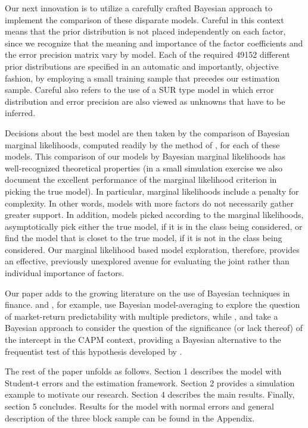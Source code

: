 Our next innovation is to utilize a carefully crafted Bayesian approach to implement the comparison of these disparate models. Careful in this context means that the prior distribution is not placed independently on each factor, since we recognize that the meaning and importance of the factor coefficients and the error precision matrix vary by model. 
Each of the required 49152 different prior distributions are specified in an automatic and importantly, objective fashion, by employing a small training sample that precedes our estimation sample. 
Careful also refers to the use of a SUR type model in which error distribution and error precision are also viewed as unknowns that have to be inferred.

Decisions about the best model are then taken by the comparison of Bayesian marginal likelihoods, computed readily by the method of \cite{chib1995marginal}, for each of these models. 
This comparison of our models by Bayesian marginal likelihoods has well-recognized theoretical properties (in a small simulation exercise we also document the excellent performance of the marginal likelihood criterion in picking the true model). 
In particular, marginal likelihoods include a penalty for complexity. 
In other words, models with more factors do not necessarily gather greater support. 
In addition, models picked according to the marginal likelihoods, asymptotically pick either the true model, if it is in the class being considered, or find the model that is closet to the true model, if it is not in the class being considered. 
Our marginal likelihood based model exploration, therefore, provides an effective, previously unexplored avenue for evaluating the joint rather than individual importance of factors.


Our paper adds to the growing literature on the use of Bayesian techniques in finance.
\cite{avramov2002stock} and \cite{cremers2002stock}, for example, use Bayesian model-averaging to explore the question of market-return predictability with multiple predictors, while \cite{shanken1987bayesian}, \cite{harvey1990bayesian} and \cite{avramov2006exact} take a Bayesian approach to consider the question of the significance (or lack thereof) of the intercept in the CAPM context, providing a Bayesian alternative to the frequentist test of this hypothesis developed by \cite{gibbons1989test}.



The rest of the paper unfolds as follows.
Section 1 describes the model with Student-t errors and the estimation framework. 
Section 2 provides a simulation example to motivate our research.
Section 4 describes the main results. 
Finally, section 5 concludes. 
Results for the model with normal errors and general description of the three block sample can be found in the Appendix.


